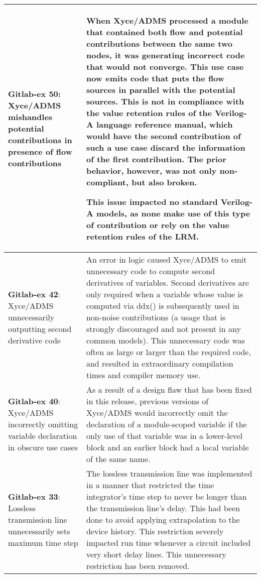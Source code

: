 {\begin{longtable}[h] {>{\raggedright\small}m{2in}|>{\raggedright\let\\\tabularnewline\small}m{3.5in}}
\textbf{Gitlab-ex 50}: Xyce/ADMS mishandles potential contributions in presence of flow contributions &
When Xyce/ADMS processed a module that contained both flow and
potential contributions between the same two nodes, it was generating
incorrect code that would not converge.  This use case now emits code
that puts the flow sources in parallel with the potential sources.
This is not in compliance with the value retention rules of the
Verilog-A language reference manual, which would have the second
contribution of such a use case discard the information of the first
contribution.  The prior behavior, however, was not only
non-compliant, but also broken.

This issue impacted no standard Verilog-A models, as none make use of
this type of contribution or rely on the value retention rules of the LRM.
\\ \hline

\textbf{Gitlab-ex 42}: Xyce/ADMS unnecessarily outputting second derivative code &
An error in logic caused Xyce/ADMS to emit unnecessary code to compute
second derivatives of variables.  Second derivatives are only required
when a variable whose value is computed via ddx() is subsequently used
in non-noise contributions (a usage that is strongly discouraged and
not present in any common models).  This unnecessary code was often as
large or larger than the required code, and resulted in extraordinary
compilation times and compiler memory use. \\ \hline

\textbf{Gitlab-ex 40}: Xyce/ADMS incorrectly omitting variable declaration in obscure use cases &
As a result of a design flaw that has been fixed in this release,
previous versions of Xyce/ADMS would incorrectly omit the declaration
of a module-scoped variable if the only use of that variable was in a
lower-level block and an earlier block had a local variable of the
same name. \\ \hline

\textbf{Gitlab-ex 33}: Lossless transmission line unnecessarily sets maximum time step &
The \Xyce{} lossless transmission line was implemented in a manner
that restricted the time integrator's time step to never
be longer than the transmission line's delay.  This had been done to
avoid applying extrapolation to the device history.  This restriction
severely impacted run time whenever a circuit included very short
delay lines.  This unnecessary restriction has been removed.  \\ \hline


\end{longtable}}
